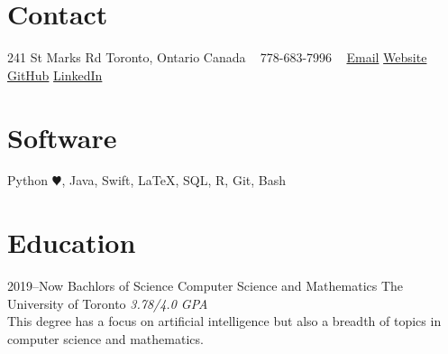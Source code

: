 \documentclass[]{style}
\begin{document}


\begin{aside} %
\section{Contact}
241 St Marks Rd
Toronto, Ontario
Canada
~
778-683-7996
~
\href{mailto:sacha.goldman@mail.utoronto.ca}{Email}
\href{sachagoldman.com}{Website}
\href{https://github.com/SachaGoldman}{GitHub}
\href{https://linkedin.com/in/sacha-goldman-5b95391a0/}{LinkedIn}
\section{Software}
Python {\color{red} $\varheartsuit$}, Java,
Swift, \LaTeX, SQL, 
R, Git, Bash
\end{aside}


\section{Education}

\begin{entrylist}


\entry
{2019--Now}
{Bachlors of Science {\normalfont Computer Science and Mathematics}}
{The University of Toronto}
{\emph{3.78/4.0 GPA} \\ This degree has a focus on artificial intelligence but also a breadth of topics in computer science and mathematics.}


\end{entrylist}

\end{document}
